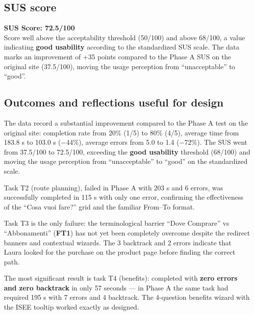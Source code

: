 ﻿\documentclass[11pt,a4paper]{article}
\begin{document}
\subsection*{SUS score}
\begin{tcolorbox}[base]
\textbf{SUS Score: 72.5/100}\\[0.2cm]
\small Score well above the acceptability threshold
(50/100) and above 68/100, a value indicating \textbf{good
usability} according to the standardized SUS scale. The data marks
an improvement of +35 points compared to the Phase A SUS on the original
site (37.5/100), moving the usage perception from
``unacceptable'' to ``good''.
\end{tcolorbox}

\subsection*{Outcomes and reflections useful for design}
\begin{tcolorbox}[base]
The data record a substantial improvement compared to the Phase A
test on the original site: completion rate from 20\%
(1/5) to 80\% (4/5), average time from 183.8 s to 103.0 s
($-$44\%), average errors from 5.0 to 1.4 ($-$72\%). The SUS went
from 37.5/100 to 72.5/100, exceeding the \textbf{good usability} threshold
(68/100) and moving the usage perception from ``unacceptable'' to
``good'' on the standardized scale.

\medskip

Task T2 (route planning), failed in Phase A with
203 s and 6 errors, was successfully completed in 115 s with
only one error, confirming the effectiveness of the
``Cosa vuoi fare?'' grid and the familiar From--To format.

\medskip

Task T3 is the only failure: the terminological barrier
``Dove Comprare'' vs ``Abbonamenti'' (\textbf{FT1}) has not
yet been completely overcome despite the redirect
banners and contextual wizards. The 3 backtrack and 2 errors
indicate that Laura looked for the purchase on the product
page before finding the correct path.

\medskip

The most significant result is task T4 (benefits):
completed with \textbf{zero errors and zero backtrack} in only
57 seconds --- in Phase A the same task had required 195 s
with 7 errors and 4 backtrack. The 4-question benefits wizard
with the ISEE tooltip worked exactly as designed.
\end{tcolorbox}
\end{document}
